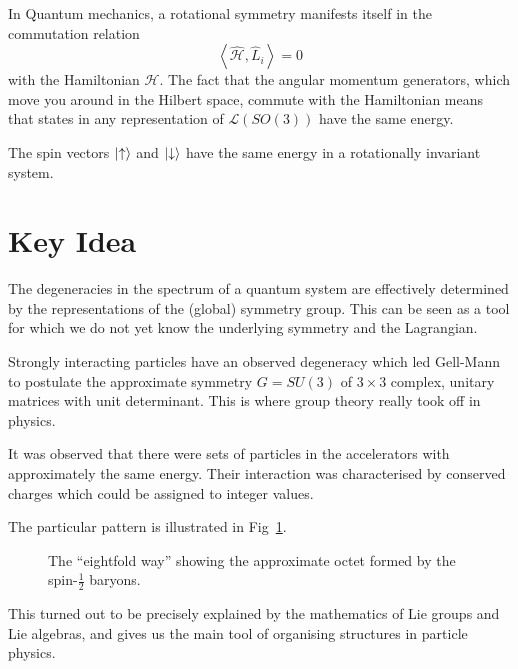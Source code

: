 In Quantum mechanics, a rotational symmetry manifests itself in the commutation relation
\begin{equation}
  \left\langle \hat{\mathcal{H}}, \hat L_i \right\rangle = 0
\end{equation}
with the Hamiltonian $\mathcal{H}$. The fact that the angular momentum generators, which move you around in the Hilbert space, commute with the Hamiltonian means that states in any representation of $\mathcal{L}(SO(3))$ have the same energy.

\begin{example}[]
The spin vectors $\ket{\uparrow}$ and $\ket{\downarrow}$ have the same energy in a rotationally invariant system.
\end{example}

\section{Key Idea}%
\label{sec:key_idea}

The degeneracies in the spectrum of a quantum system are effectively determined by the representations of the (global) symmetry group.
This can be seen as a tool for which we do not yet know the underlying symmetry and the Lagrangian.

\begin{example}
Strongly interacting particles have an observed degeneracy which led Gell-Mann to postulate the approximate symmetry $G = SU(3)$ of $3\times 3$ complex, unitary matrices with unit determinant.
This is where group theory really took off in physics.

It was observed that there were sets of particles in the accelerators with approximately the same energy. Their interaction was characterised by conserved charges which could be assigned to integer values.

  The particular pattern is illustrated in Fig~\ref{fig:eightfold}.

  \begin{figure}[htpb]
    \centering
    \def\svgwidth{0.5\columnwidth}
    
    \caption{The ``eightfold way'' showing the approximate octet formed by the spin-$\frac{1}{2}$ baryons.}
    \label{fig:eightfold}
  \end{figure}
This turned out to be precisely explained by the mathematics of Lie groups and Lie algebras, and gives us the main tool of organising structures in particle physics.
\end{example} 

